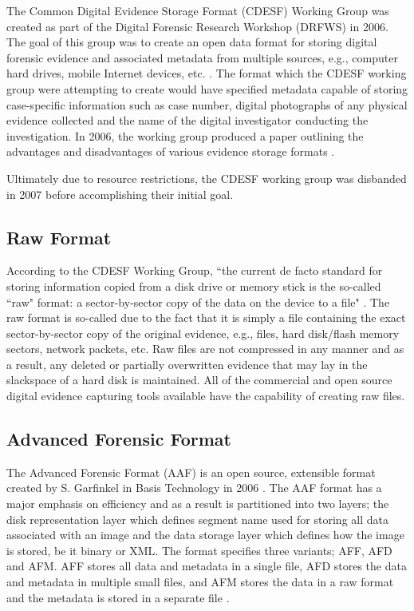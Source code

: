 \documentclass[runningheads,a4paper]{llncs}
\begin{document}
The Common Digital Evidence Storage Format (CDESF) Working Group was created as part of the Digital Forensic Research Workshop (DRFWS) in 2006. The goal of this group was to create an open data format for storing digital forensic evidence and associated metadata from multiple sources, e.g., computer hard drives, mobile Internet devices, etc. \cite{cdesf}. The format which the CDESF working group were attempting to create would have specified metadata capable of storing case-specific information such as case number, digital photographs of any physical evidence collected and the name of the digital investigator conducting the investigation. In 2006, the working group produced a paper outlining the advantages and disadvantages of various evidence storage formats \cite{dfrws2006}.

Ultimately due to resource restrictions, the CDESF working group was disbanded in 2007 before accomplishing their initial goal.

\subsection{Raw Format}
\label{ch2:raw}

According to the CDESF Working Group, ``the current de facto standard for storing information copied from a disk drive or memory stick is the so-called ``raw" format: a sector-by-sector copy of the data on the device to a file" \cite{evidencestandards}. The raw format is so-called due to the fact that it is simply a file containing the exact sector-by-sector copy of the original evidence, e.g., files, hard disk/flash memory sectors, network packets, etc. Raw files are not compressed in any manner and as a result, any deleted or partially overwritten evidence that may lay in the slackspace of a hard disk is maintained. All of the commercial and open source digital evidence capturing tools available have the capability of creating raw files.

\subsection{Advanced Forensic Format}
\label{ch2:aaf}

The Advanced Forensic Format (AAF) is an open source, extensible format created by S. Garfinkel in Basis Technology in 2006 \cite{aaf}. The AAF format has a major emphasis on efficiency and as a result is partitioned into two layers; the disk representation layer which defines segment name used for storing all data associated with an image and the data storage layer which defines how the image is stored, be it binary or XML\cite{containers}. The format specifies three variants; AFF, AFD and AFM. AFF stores all data and metadata in a single file, AFD stores the data and metadata in multiple small files, and AFM stores the data in a raw format and the metadata is stored in a separate file \cite{containers}.
\end{document}
